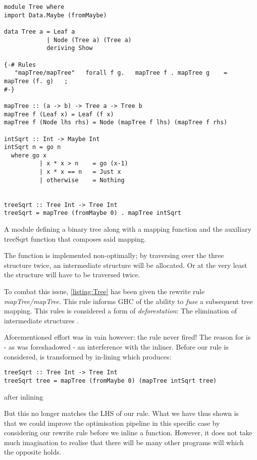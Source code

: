 \begin{listing}[H]
\begin{verbatim}
module Tree where
import Data.Maybe (fromMaybe)

data Tree a = Leaf a 
            | Node (Tree a) (Tree a) 
            deriving Show

{-# Rules
   "mapTree/mapTree"   forall f g.   mapTree f . mapTree g    = mapTree (f. g)   ;
#-}

mapTree :: (a -> b) -> Tree a -> Tree b
mapTree f (Leaf x) = Leaf (f x)
mapTree f (Node lhs rhs) = Node (mapTree f lhs) (mapTree f rhs)

intSqrt :: Int -> Maybe Int
intSqrt n = go n
  where go x
          | x * x > n    = go (x-1)
          | x * x == n   = Just x
          | otherwise    = Nothing


treeSqrt :: Tree Int -> Tree Int
treeSqrt = mapTree (fromMaybe 0) . mapTree intSqrt
\end{verbatim}
\caption{A module defining a binary tree along with a mapping function and the auxiliary treeSqrt
function that composes said mapping.}
\label{listing:Tree}
\end{listing}

The  function is implemented non-optimally; by traversing
over the three structure twice, an intermediate structure will be allocated.
Or at the very least the structure will have to be traversed twice.

To combat this issue, \cref{listing:Tree} has been given the 
rewrite rule \textit{mapTree/mapTree}. This rule informs GHC of the ability
to \textit{fuse} a subsequent tree mapping. This rules is considered a form
of \textit{deforestation}: The elimination of intermediate structures \cite{WADLER1990231}.

Aforementioned effort was in vain however: the rule never fired! The reason for is - as was
foreshadowed - an interference with the inliner. Before our rule is considered, 
is transformed by in-lining  which produces: 

\begin{listing}[H]
\begin{verbatim}
treeSqrt :: Tree Int -> Tree Int
treeSqrt tree = mapTree (fromMaybe 0) (mapTree intSqrt tree)
\end{verbatim}
\caption{ after inlining }
\label{listing:Tree_inlined}
\end{listing}

But this no longer matches the LHS of our  rule. What we have thus shown
is that we could improve the optimisation pipeline in this specific case by considering our
rewrite rule before we inline a function. However, it does not take much imagination to
realise that there will be many other programs will which the opposite holds.

